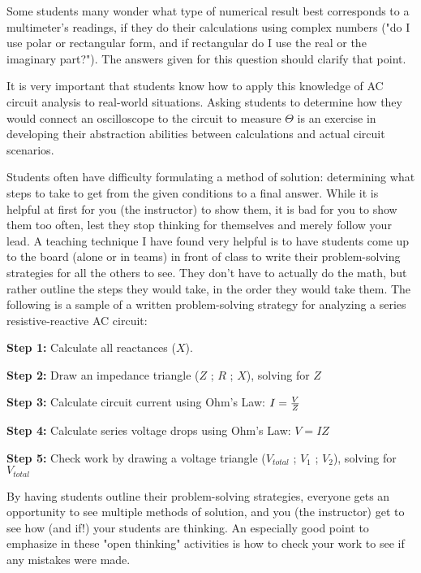 





Some students many wonder what type of numerical result best corresponds to a multimeter's readings, if they do their calculations using complex numbers ("do I use polar or rectangular form, and if rectangular do I use the real or the imaginary part?").  The answers given for this question should clarify that point.

It is very important that students know how to apply this knowledge of AC circuit analysis to real-world situations.  Asking students to determine how they would connect an oscilloscope to the circuit to measure $\Theta$ is an exercise in developing their abstraction abilities between calculations and actual circuit scenarios.

\vskip 10pt

Students often have difficulty formulating a method of solution: determining what steps to take to get from the given conditions to a final answer.  While it is helpful at first for you (the instructor) to show them, it is bad for you to show them too often, lest they stop thinking for themselves and merely follow your lead.  A teaching technique I have found very helpful is to have students come up to the board (alone or in teams) in front of class to write their problem-solving strategies for all the others to see.  They don't have to actually do the math, but rather outline the steps they would take, in the order they would take them.  The following is a sample of a written problem-solving strategy for analyzing a series resistive-reactive AC circuit:

\vskip 10pt

\goodbreak

{\bf Step 1:} Calculate all reactances ($X$).

{\bf Step 2:} Draw an impedance triangle ($Z$ ; $R$ ; $X$), solving for $Z$

{\bf Step 3:} Calculate circuit current using Ohm's Law: $I = {V \over Z}$

{\bf Step 4:} Calculate series voltage drops using Ohm's Law: $V = {I Z}$

{\bf Step 5:} Check work by drawing a voltage triangle ($V_{total}$ ; $V_1$ ; $V_2$), solving for $V_{total}$

\vskip 10pt

By having students outline their problem-solving strategies, everyone gets an opportunity to see multiple methods of solution, and you (the instructor) get to see how (and if!) your students are thinking.  An especially good point to emphasize in these "open thinking" activities is how to check your work to see if any mistakes were made.




